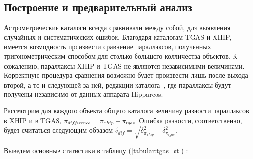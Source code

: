 \documentclass[14pt]{article} %
\begin{document}
\subsection{Построение и предварительный анализ}\label{errvid}

Астрометрические каталоги всегда сравнивали между собой, для выявления случайных и систематических ошибок. Благодаря каталогам TGAS и XHIP, имеется возмодность произвести сравнение параллаксов, полученных тригонометрическим способом для столько большого колличества объектов. К сожалению, параллаксы XHIP и TGAS  не являются независимыми величинами. Корректную процедура сравнения возможно будет произвести лишь после выхода второй, а то и следующей за ней, редакции каталога~\cite{wiki:gaia}, где параллаксы будут получены независимо от данных аппарата Hipparcos.

Рассмотрим для каждого объекта общего каталога величину разности параллаксов в XHIP и в TGAS, $\pi_{difference} = \pi_{xhip} - \pi_{tgas}$. Ошибка разности, соответственно, будет считаться следующим образом $\delta_{dif} = \sqrt{\delta^2_{\pi_{xhip}} + \delta^2_{\pi_{tgas}}}$. 

Выведем основные статистики в таблицу (\ref{tabular:tgas_st}) :
\end{document}
